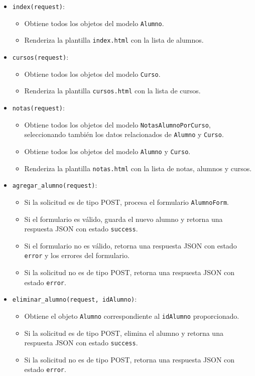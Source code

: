\documentclass{article}
\begin{document}
\begin{itemize}
    \item \texttt{index(request)}:
    \begin{itemize}
        \item Obtiene todos los objetos del modelo \texttt{Alumno}.
        \item Renderiza la plantilla \texttt{index.html} con la lista de alumnos.
    \end{itemize}

    \item \texttt{cursos(request)}:
    \begin{itemize}
        \item Obtiene todos los objetos del modelo \texttt{Curso}.
        \item Renderiza la plantilla \texttt{cursos.html} con la lista de cursos.
    \end{itemize}

    \item \texttt{notas(request)}:
    \begin{itemize}
        \item Obtiene todos los objetos del modelo \texttt{NotasAlumnoPorCurso}, seleccionando también los datos relacionados de \texttt{Alumno} y \texttt{Curso}.
        \item Obtiene todos los objetos del modelo \texttt{Alumno} y \texttt{Curso}.
        \item Renderiza la plantilla \texttt{notas.html} con la lista de notas, alumnos y cursos.
    \end{itemize}

    \item \texttt{agregar\_alumno(request)}:
    \begin{itemize}
        \item Si la solicitud es de tipo POST, procesa el formulario \texttt{AlumnoForm}.
        \item Si el formulario es válido, guarda el nuevo alumno y retorna una respuesta JSON con estado \texttt{success}.
        \item Si el formulario no es válido, retorna una respuesta JSON con estado \texttt{error} y los errores del formulario.
        \item Si la solicitud no es de tipo POST, retorna una respuesta JSON con estado \texttt{error}.
    \end{itemize}

    \item \texttt{eliminar\_alumno(request, idAlumno)}:
    \begin{itemize}
        \item Obtiene el objeto \texttt{Alumno} correspondiente al \texttt{idAlumno} proporcionado.
        \item Si la solicitud es de tipo POST, elimina el alumno y retorna una respuesta JSON con estado \texttt{success}.
        \item Si la solicitud no es de tipo POST, retorna una respuesta JSON con estado \texttt{error}.
    \end{itemize}


\end{itemize}
\end{document}
